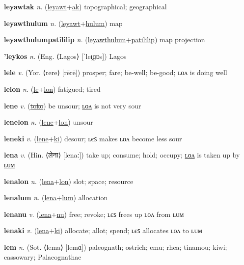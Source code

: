 \textbf{\hypertarget{leyawtak}{leyawtak}} \textit{n.} (\hyperlink{leyawt}{leyawt}+\allowbreak \hyperlink{ak}{ak})
topographical; geographical

\textbf{\hypertarget{leyawthulum}{leyawthulum}} \textit{n.} (\hyperlink{leyawt}{leyawt}+\allowbreak \hyperlink{hulum}{hulum})
map

\textbf{\hypertarget{leyawthulumpatililip}{leyawthulumpatililip}} \textit{n.} (\hyperlink{leyawthulum}{leyawthulum}+\allowbreak \hyperlink{patililip}{patililip})
map projection

\textbf{\hypertarget{'leykos}{'leykos}} \textit{n.} (Eng. ⟨Lagos⟩ [ˈleɪ̯ɡɒs])
Lagos

\textbf{\hypertarget{lele}{lele}} \textit{v.} (Yor. ⟨rere⟩ [rērē])
prosper; fare; be-well; be-good; ʟᴏᴧ is doing well

\textbf{\hypertarget{lelon}{lelon}} \textit{n.} (\hyperlink{le}{le}+\allowbreak \hyperlink{lon}{lon})
fatigued; tired

\textbf{\hypertarget{lene}{lene}} \textit{v.} (\hyperlink{toko}{\sout{toko}})
be unsour; \hyperlink{lenelon}{ʟᴏᴧ} is not very sour

\textbf{\hypertarget{lenelon}{lenelon}} \textit{n.} (\hyperlink{lene}{lene}+\allowbreak \hyperlink{lon}{lon})
unsour

\textbf{\hypertarget{leneki}{leneki}} \textit{v.} (\hyperlink{lene}{lene}+\allowbreak \hyperlink{ki}{ki})
desour; ʟєꜱ makes ʟᴏᴧ become less sour

\textbf{\hypertarget{lena}{lena}} \textit{v.} (Hin. ⟨{\devanagari{}लेना}⟩ [lenaː])
take up; consume; hold; occupy; \hyperlink{lenalon}{ʟᴏᴧ} is taken up by \hyperlink{lenalum}{ʟᴜᴍ}

\textbf{\hypertarget{lenalon}{lenalon}} \textit{n.} (\hyperlink{lena}{lena}+\allowbreak \hyperlink{lon}{lon})
slot; space; resource

\textbf{\hypertarget{lenalum}{lenalum}} \textit{n.} (\hyperlink{lena}{lena}+\allowbreak \hyperlink{lum}{lum})
allocation

\textbf{\hypertarget{lenanu}{lenanu}} \textit{v.} (\hyperlink{lena}{lena}+\allowbreak \hyperlink{nu}{nu})
free; revoke; ʟєꜱ frees up ʟᴏᴧ from ʟᴜᴍ

\textbf{\hypertarget{lenaki}{lenaki}} \textit{v.} (\hyperlink{lena}{lena}+\allowbreak \hyperlink{ki}{ki})
allocate; allot; spend; ʟєꜱ allocates ʟᴏᴧ to ʟᴜᴍ

\textbf{\hypertarget{lem}{lem}} \textit{n.} (Sot. ⟨lema⟩ [lemɑ])
paleognath; ostrich; emu; rhea; tinamou; kiwi; cassowary; Palaeognathae

